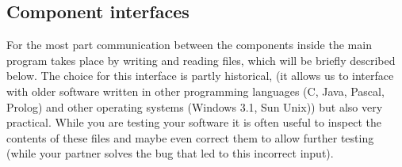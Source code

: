 \documentclass[10pt]{scrartcl}
\begin{document}
\begin{comment}
\subsection{The robot simulator}

In order to check that the robot will not demolish its surroundings,
your commands will be sent to a simulator. Thus to determine
whether a particular solution to the problem is correct it is first
visualized. The simulator can be started using the program {\ttfamily
umirtxsimulator}. By running the program in the same directory as the
{\ttfamily playchess} program, the simulator will perform the black move.

When your lab assistants have confidence in your approach, they can put
the real robot arm into work using your software, via the `move
robot'-button of the simulator.
This button is the interface to a server that controls the robot. One
of the activities of the server is to calculate the `encoder counts'
based on the specified joint-angles. These encoder counts are the number
of steps the motors of the robot arm have to make to arrive at the given
joint angles. In general controllers are interesting things, but for now
of no importance to you. However, it is important that the controller is
there. It forms the interface between the joint angles and the flow of
currents to the actuators; in this case electrically powered rotary
motors.

\subsection{The chess program `GNUChess'}

This is a chess playing program which decides what move the robot should
play given the current board setting. In tasks 2 and 3 your modules have
to make sure that the move suggested by GnuChess is the one actually
played by the robot.

\end{comment}



\subsection{Component interfaces}

For the most part communication between the components inside the main program 
takes place by writing and reading files, which will be
briefly described below. The choice for this interface is partly historical,
(it allows us to interface with older software written in other programming languages (C, Java, Pascal, Prolog) 
and other operating systems (Windows 3.1, Sun Unix)) but also very practical.
While you are testing your software it is often useful to inspect 
the contents of these files and maybe even correct them to allow further testing 
(while your partner solves the bug that led to this incorrect input).
\end{document}
